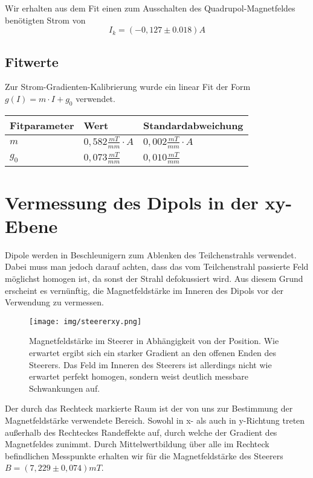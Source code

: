 \documentclass[bigchapter,colorback,accentcolor=tud4b,linedtoc,11pt]{tudreport}
\begin{document}
Wir erhalten aus dem Fit einen zum Ausschalten des Quadrupol-Magnetfeldes benötigten Strom von $$I_k=(-0,127 \pm 0.018)A$$
\subsection{Fitwerte}

Zur Strom-Gradienten-Kalibrierung wurde ein linear Fit der Form $g(I) = m \cdot I + g_0$ verwendet.
\begin{center}
  \begin{tabular}{|p{2.6cm}|p{2.6cm}|p{3.5cm}|}
    \hline
    Fitparameter & Wert    & Standardabweichung \\ \hline
    $m$          & $0,582 \frac{mT}{mm} \cdot A$ & $0,002 \frac{mT}{mm} \cdot A$            \\ \hline
    $g_0$        & $0,073 \frac{mT}{mm}$ & $0,010 \frac{mT}{mm}$            \\ \hline
	\end{tabular}
\end{center}

\clearpage{}
\section{Vermessung des Dipols in der xy-Ebene}

Dipole werden in Beschleunigern zum Ablenken des Teilchenstrahls verwendet. Dabei muss man jedoch darauf achten, dass das vom Teilchenstrahl passierte Feld möglichst homogen ist, da sonst der Strahl defokussiert wird. Aus diesem Grund erscheint es vernünftig, die Magnetfeldstärke im Inneren des Dipols vor der Verwendung zu vermessen.

\begin{figure}[H]
\centering
\texttt{[image: img/steererxy.png]}
\caption{Magnetfeldstärke im Steerer in Abhängigkeit von der Position. Wie erwartet ergibt sich ein starker Gradient an den offenen Enden des Steerers. Das Feld im Inneren des Steerers ist allerdings nicht wie erwartet perfekt homogen, sondern weist deutlich messbare Schwankungen auf.}
\end{figure}

Der durch das Rechteck markierte Raum ist der von uns zur Bestimmung der Magnetfeldstärke verwendete Bereich. Sowohl in x- als auch in y-Richtung treten außerhalb des Rechteckes Randeffekte auf, durch welche der Gradient des Magnetfeldes zunimmt. Durch Mittelwertbildung über alle im Rechteck befindlichen Messpunkte erhalten wir für die Magnetfeldstärke des Steerers $B=(7,229 \pm 0,074)mT$.
\end{document}
